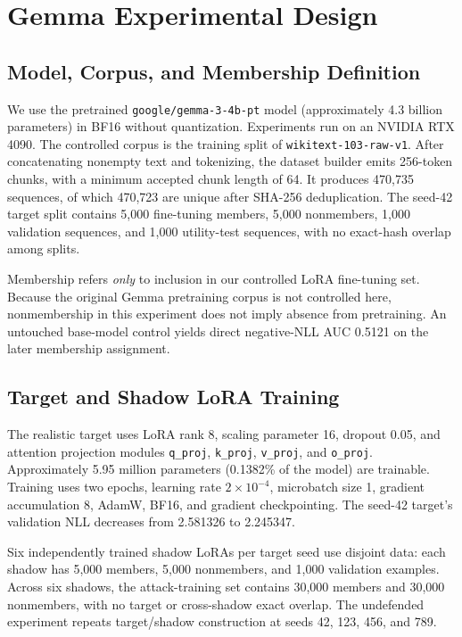 \documentclass[conference]{IEEEtran}
\begin{document}
\section{Gemma Experimental Design}
\subsection{Model, Corpus, and Membership Definition}
We use the pretrained \texttt{google/gemma-3-4b-pt} model (approximately 4.3 billion parameters) in BF16 without quantization. Experiments run on an NVIDIA RTX 4090. The controlled corpus is the training split of \texttt{wikitext-103-raw-v1}. After concatenating nonempty text and tokenizing, the dataset builder emits 256-token chunks, with a minimum accepted chunk length of 64. It produces 470,735 sequences, of which 470,723 are unique after SHA-256 deduplication. The seed-42 target split contains 5,000 fine-tuning members, 5,000 nonmembers, 1,000 validation sequences, and 1,000 utility-test sequences, with no exact-hash overlap among splits.

Membership refers \emph{only} to inclusion in our controlled LoRA fine-tuning set. Because the original Gemma pretraining corpus is not controlled here, nonmembership in this experiment does not imply absence from pretraining. An untouched base-model control yields direct negative-NLL AUC 0.5121 on the later membership assignment.

\subsection{Target and Shadow LoRA Training}
The realistic target uses LoRA rank 8, scaling parameter 16, dropout 0.05, and attention projection modules \texttt{q\_proj}, \texttt{k\_proj}, \texttt{v\_proj}, and \texttt{o\_proj}. Approximately 5.95 million parameters (0.1382\% of the model) are trainable. Training uses two epochs, learning rate $2\times10^{-4}$, microbatch size 1, gradient accumulation 8, AdamW, BF16, and gradient checkpointing. The seed-42 target's validation NLL decreases from 2.581326 to 2.245347.

Six independently trained shadow LoRAs per target seed use disjoint data: each shadow has 5,000 members, 5,000 nonmembers, and 1,000 validation examples. Across six shadows, the attack-training set contains 30,000 members and 30,000 nonmembers, with no target or cross-shadow exact overlap. The undefended experiment repeats target/shadow construction at seeds 42, 123, 456, and 789.
\end{document}
